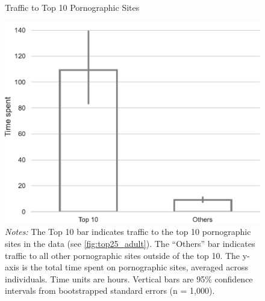 \documentclass[12pt, letterpaper]{article}
\begin{document}
\begin{figure}
	\centering
	\caption{Traffic to Top 10 Pornographic Sites}
	\includegraphics[width=.5\textwidth]{figs/concentration_porn_consumption.pdf}
	\caption*{\footnotesize \emph{Notes:} 
		The Top 10 bar indicates traffic to the top 10 pornographic sites in the data (see \cref{fig:top25_adult}).
		The ``Others'' bar indicates traffic to all other pornographic sites outside of the top 10.
		The y-axis is the total time spent on pornographic sites, averaged across individuals.
		Time units are hours.
		Vertical bars are 95\% confidence intervals from bootstrapped standard errors (n = 1,000).
	}
	\label{fig:concentration_porn_consumption}
\end{figure}
\end{document}
